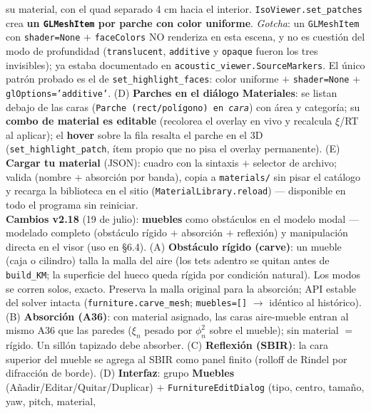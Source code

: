 \documentclass[11pt, a4paper]{article}
\newcommand{\menu}[1]{\textbf{\guillemotleft #1\guillemotright}}
\begin{document}
\begin{center}
{    su material, con el quad separado 4 cm hacia el interior.
    \texttt{IsoViewer.set\_patches} crea \textbf{un \texttt{GLMeshItem} por
    parche con color uniforme}. \emph{Gotcha}: un \texttt{GLMeshItem} con
    \texttt{shader=None} $+$ \texttt{faceColors} NO renderiza en esta escena, y
    no es cuestión del modo de profundidad (\texttt{translucent},
    \texttt{additive} y \texttt{opaque} fueron los tres invisibles); ya estaba
    documentado en \texttt{acoustic\_viewer.SourceMarkers}. El único patrón
    probado es el de \texttt{set\_highlight\_faces}: color uniforme $+$
    \texttt{shader=None} $+$ \texttt{glOptions='additive'}.
    (D) \textbf{Parches en el diálogo Materiales}: se listan debajo de las caras
    (\texttt{Parche (rect/polígono) en \emph{cara}}) con área y categoría; su
    \textbf{combo de material es editable} (recolorea el overlay en vivo y
    recalcula $\xi$/RT al aplicar); el \textbf{hover} sobre la fila resalta el
    parche en el 3D (\texttt{set\_highlight\_patch}, ítem propio que no pisa el
    overlay permanente).
    (E) \textbf{Cargar tu material} (JSON): cuadro con la sintaxis $+$ selector
    de archivo; valida (nombre $+$ absorción por banda), copia a
    \texttt{materials/} sin pisar el catálogo y recarga la biblioteca en el
    sitio (\texttt{MaterialLibrary.reload}) --- disponible en todo el programa
    sin reiniciar.\\[2pt]
    \textbf{Cambios v2.18} (19 de julio): \textbf{muebles} como obstáculos en el
    modelo modal --- modelado completo (obstáculo rígido $+$ absorción $+$
    reflexión) y manipulación directa en el visor (uso en \S6.4).
    (A) \textbf{Obstáculo rígido (carve)}: un mueble (caja o cilindro) talla la
    malla del aire (los tets adentro se quitan antes de \texttt{build\_KM}; la
    superficie del hueco queda rígida por condición natural). Los modos se corren
    solos, exacto. Preserva la malla original para la absorción; API estable del
    solver intacta (\texttt{furniture.carve\_mesh}; \texttt{muebles=[]}
    $\to$ idéntico al histórico).
    (B) \textbf{Absorción (A36)}: con material asignado, las caras aire-mueble
    entran al mismo A36 que las paredes ($\xi_n$ pesado por $\phi_n^2$ sobre el
    mueble); sin material $=$ rígido. Un sillón tapizado debe absorber.
    (C) \textbf{Reflexión (SBIR)}: la cara superior del mueble se agrega al SBIR
    como panel finito (rolloff de Rindel por difracción de borde).
    (D) \textbf{Interfaz}: grupo \menu{Muebles} (Añadir/Editar/Quitar/Duplicar)
    $+$ \texttt{FurnitureEditDialog} (tipo, centro, tamaño, yaw, pitch, material,
}
\end{center}
\end{document}
